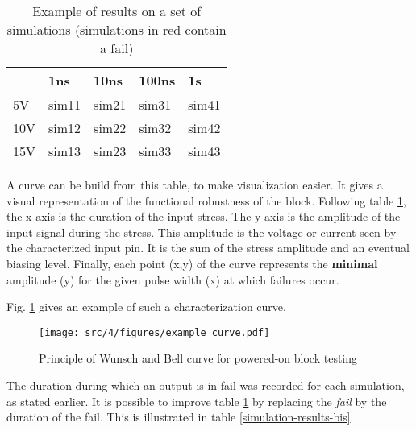 \begin{table}[!h]
\centering
\begin{tabular}{@{}lllll@{}}
\toprule
    & 1ns                          & 10ns                         & 100ns                        & 1\textmugreek{}s             \\ \midrule
5V  & {\color[HTML]{32CB00} sim11} & {\color[HTML]{32CB00} sim21} & {\color[HTML]{32CB00} sim31} & {\color[HTML]{FE0000} sim41} \\
10V & {\color[HTML]{32CB00} sim12} & {\color[HTML]{FE0000} sim22} & {\color[HTML]{FE0000} sim32} & {\color[HTML]{FE0000} sim42} \\
15V & {\color[HTML]{FE0000} sim13} & {\color[HTML]{FE0000} sim23} & {\color[HTML]{FE0000} sim33} & {\color[HTML]{FE0000} sim43} \\ \bottomrule
\end{tabular}
\caption{Example of results on a set of simulations (simulations in red contain a fail)}
\label{simulation-results}
\end{table}

A curve can be build from this table, to make visualization easier.
It gives a visual representation of the functional robustness of the block.
Following table \ref{simulation-results}, the x axis is the duration of the input stress.
The y axis is the amplitude of the input signal during the stress.
This amplitude is the voltage or current seen by the characterized input pin.
It is the sum of the stress amplitude and an eventual biasing level.
Finally, each point (x,y) of the curve represents the \textbf{minimal} amplitude (y) for the given pulse width (x) at which failures occur.

Fig. \ref{wb_cz_curve_example} gives an example of such a characterization curve.

\begin{figure}[!h]
  \centering
  \texttt{[image: src/4/figures/example\_curve.pdf]}
  \caption{Principle of Wunsch and Bell curve for powered-on block testing}
  \label{wb_cz_curve_example}
\end{figure}

The duration during which an output is in fail was recorded for each simulation, as stated earlier.
It is possible to improve table \ref{simulation-results} by replacing the \textit{fail} by the duration of the fail.
This is illustrated in table \ref{simulation-results-bis}.

